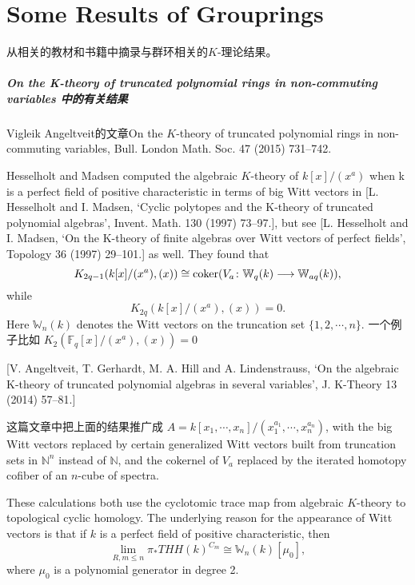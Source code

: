 \chapter{Some Results of Grouprings}

从相关的教材和书籍中摘录与群环相关的$K$-理论结果。

\paragraph{On the K-theory of truncated polynomial rings
in non-commuting variables 中的有关结果} %
\label{par:on_the_k_theory_of_truncated_polynomial_rings_in_non_commuting_variables_中的有关结果}
Vigleik Angeltveit的文章On the $K$-theory of truncated polynomial rings in non-commuting variables, Bull. London Math. Soc. 47 (2015) 731–742.

Hesselholt and Madsen computed the algebraic $K$-theory of $k[x]/(x^a)$ when k is a perfect field of positive characteristic in terms of big Witt vectors in [L. Hesselholt and I. Madsen, ‘Cyclic polytopes and the K-theory of truncated polynomial algebras’, Invent. Math. 130 (1997) 73–97.], but see [L. Hesselholt and I. Madsen, ‘On the K-theory of finite algebras over Witt vectors of perfect fields’, Topology 36 (1997) 29–101.] as well. They found that
\[K_{2q-1}(k[x]/(x^a), (x)) \cong \mathrm{coker}(V_a \colon \mathbb{W}_q(k) \longrightarrow \mathbb{W}_{aq}(k)),\]
while
\[K_{2q}(k[x]/(x^a), (x)) = 0.\]
Here $\mathbb{W}_n(k)$ denotes the Witt vectors on the truncation set $\{1, 2, \cdots , n\}$.
一个例子比如
$K_{2}(\mathbb{F}_q[x]/(x^a), (x)) = 0$

[V. Angeltveit, T. Gerhardt, M. A. Hill and A. Lindenstrauss, ‘On the algebraic K-theory of truncated polynomial algebras in several variables’, J. K-Theory 13 (2014) 57–81.] 

这篇文章中把上面的结果推广成
$A=k[x_1,\cdots,x_n]/(x_1^{a_1},\cdots,x_n^{a_n})$, with the big Witt vectors replaced by certain generalized Witt vectors built from truncation sets in $\mathbb{N}^n$ instead
of $\mathbb{N}$, and the cokernel of $V_a$ replaced by the iterated homotopy cofiber of an $n$-cube of spectra.

These calculations both use the cyclotomic trace map from algebraic $K$-theory to topological cyclic homology. The underlying reason for the appearance of Witt vectors is that if $k$ is a perfect field of positive characteristic, then
\[\lim_{R,m \leq n} \pi_* THH(k)^{C_m} \cong \mathbb{W}_n(k)[\mu_0],\]
where $\mu_0$ is a polynomial generator in degree 2.


